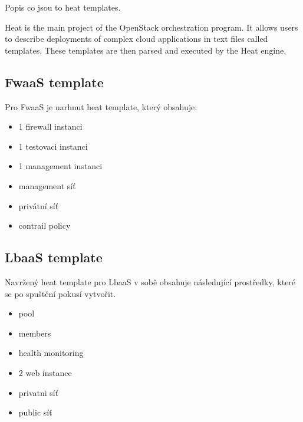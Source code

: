 Popis co jsou to heat templates.

Heat is the main project of the OpenStack orchestration program. It allows users to describe deployments of complex cloud applications in text files called templates. These templates are then parsed and executed by the Heat engine.

\subsection{FwaaS template}

Pro FwaaS je narhnut heat template, který obsahuje:

\begin{itemize}
\item 1 firewall instanci
\item 1 testovaci instanci
\item 1 management instanci
\item management síť
\item privátní síť
\item contrail policy
\end{itemize}



\subsection{LbaaS template}


Navržený heat template pro LbaaS v sobě obsahuje následující prostředky, které se po spuštění pokusí vytvořit.

\begin{itemize}
\item pool
\item members
\item health monitoring
\item 2 web instance
\item privatni síť
\item public síť
\end{itemize}

